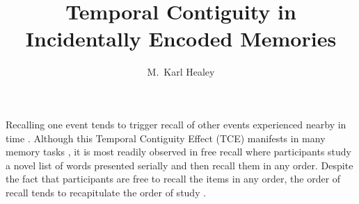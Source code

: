 \documentclass[man,natbib,floatsintext]{apa6} %
\title{Temporal Contiguity in Incidentally Encoded Memories}
\author{M.\ Karl Healey}
\affiliation{Michigan State University}
\begin{document}
\maketitle
\label{TODO-1}

\color{red}
Recalling one event tends to trigger recall of other events experienced nearby in time \citep[for a review see][]{HealKaha17}. Although this Temporal Contiguity Effect (TCE) manifests in many memory tasks \citep{DaviEtal08,SchwEtal05}, it is most readily observed in free recall where participants study a novel list of words presented serially and then recall them in any order. Despite the fact that participants are free to recall the items in any order, the order of recall tends to recapitulate the order of study \citep{Murd74,Post71,Post72,Kaha96}. %
\end{document}
